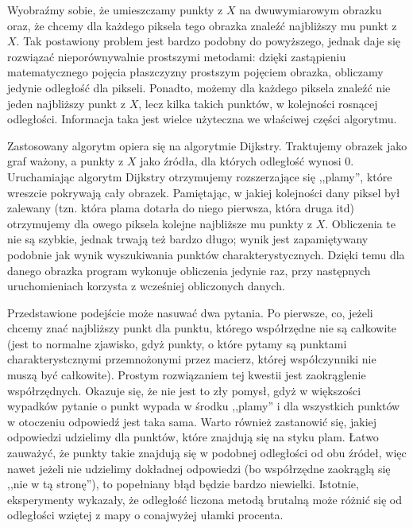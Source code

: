 \documentclass[a4paper,12pt,leqno]{article}
\begin{document}
Wyobraźmy sobie, że umieszczamy punkty z $X$ na dwuwymiarowym obrazku oraz, że chcemy dla każdego piksela tego obrazka znaleźć najbliższy mu punkt z $X$. Tak postawiony problem jest
bardzo podobny do powyższego, jednak daje się rozwiązać nieporównywalnie prostszymi metodami: dzięki zastąpieniu matematycznego pojęcia płaszczyzny prostszym pojęciem obrazka, obliczamy
jedynie odległość dla pikseli. Ponadto, możemy dla każdego piksela znaleźć nie jeden najbliższy punkt z $X$, lecz kilka takich punktów, w kolejności rosnącej odległości. Informacja taka
jest wielce użyteczna we właściwej części algorytmu.

Zastosowany algorytm opiera się na algorytmie Dijkstry. Traktujemy obrazek jako graf ważony, a punkty z $X$ jako źródła, dla których odległość wynosi $0$. Uruchamiając algorytm Dijkstry
otrzymujemy rozszerzające się ,,plamy'', które wreszcie pokrywają cały obrazek. Pamiętając, w jakiej kolejności dany piksel był zalewany (tzn. która plama dotarła do niego pierwsza, która
druga itd) otrzymujemy dla owego piksela kolejne najbliższe mu punkty z $X$. Obliczenia te nie są szybkie, jednak trwają też bardzo długo; wynik jest zapamiętywany podobnie jak wynik
wyszukiwania punktów charakterystycznych. Dzięki temu dla danego obrazka program wykonuje obliczenia jedynie raz, przy następnych uruchomieniach korzysta z wcześniej obliczonych danych.

Przedstawione podejście może nasuwać dwa pytania. Po pierwsze, co, jeżeli chcemy znać najbliższy punkt dla punktu, którego współrzędne nie są całkowite (jest to normalne zjawisko, gdyż
punkty, o które pytamy są punktami charakterystcznymi przemnożonymi przez macierz, której współczynniki nie muszą być całkowite). Prostym rozwiązaniem tej kwestii jest zaokrąglenie
współrzędnych. Okazuje się, że nie jest to zły pomysł, gdyż w większości wypadków pytanie o punkt wypada w środku ,,plamy'' i dla wszystkich punktów w otoczeniu odpowiedź jest taka sama.
Warto również zastanowić się, jakiej odpowiedzi udzielimy dla punktów, które znajdują się na styku plam. Łatwo zauważyć, że punkty takie znajdują się w podobnej odległości od obu źródeł,
więc nawet jeżeli nie udzielimy dokładnej odpowiedzi (bo współrzędne zaokrąglą się ,,nie w tą stronę''), to popełniany błąd będzie bardzo niewielki. Istotnie, eksperymenty wykazały, że
odległość liczona metodą brutalną może różnić się od odległości wziętej z mapy o conajwyżej ułamki procenta.
\end{document}
